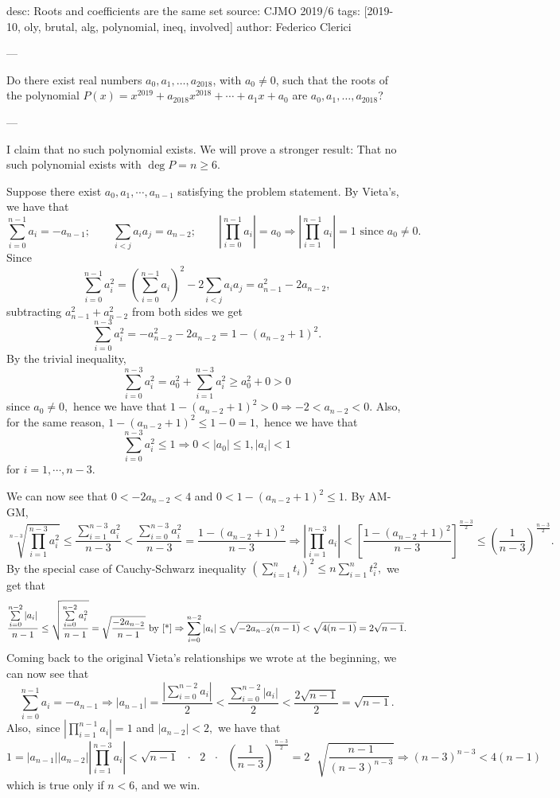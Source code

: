 desc: Roots and coefficients are the same set
source: CJMO 2019/6
tags: [2019-10, oly, brutal, alg, polynomial, ineq, involved]
author: Federico Clerici

---

Do there exist real numbers $a_0,a_1,\ldots,a_{2018}$, with $a_0\ne 0$, such that the roots of the polynomial $P(x)=x^{2019}+a_{2018}x^{2018}+\cdots+a_1x+a_0$ are $a_0,a_1,\ldots,a_{2018}$?

---

I claim that no such polynomial exists. We will prove a stronger result: That no such polynomial exists with $\deg P=n\ge 6$.

Suppose there exist $a_0,a_1,\cdots,a_{n-1}$ satisfying the problem statement. By Vieta's, we have that \[\sum_{i=0}^{n-1}a_i=-a_{n-1};\qquad\sum_{i<j}a_ia_j=a_{n-2};\qquad\left|\prod\limits_{i=0}^{n-1} a_i\right| =a_0\Rightarrow \left|\prod_{i=1}^{n-1} a_i\right|=1 \text{ since }a_0\neq 0.\]
Since
\begin{equation}\label{*}
    \sum\limits_{i=0}^{n-1}a_i^2=\left(\sum\limits_{i=0}^{n-1}a_i\right)^2-2\sum\limits_{i<j}a_ia_j=a_{n-1}^2-2a_{n-2},\tag{$\star$}
\end{equation}
subtracting $a_{n-1}^2+a_{n-2}^2$ from both sides we get \[\sum\limits_{i=0}^{n-3}a_i^2=-a_{n-2}^2-2a_{n-2}=1-(a_{n-2}+1)^2.\]
By the trivial inequality, \[\sum\limits_{i=0}^{n-3}a_i^2=a_0^2+\sum\limits_{i=1}^{n-3}a_i^2\geq a_0^2+0>0\] since $a_0\neq 0,$ hence we have that $1-(a_{n-2}+1)^2>0 \Rightarrow -2<a_{n-2}<0.$ Also, for the same reason, $1-(a_{n-2}+1)^2\leq 1-0=1,$ hence we have that \[\sum\limits_{i=0}^{n-3}a_i^2\leq 1\Rightarrow 0<|a_0|\leq 1, |a_i|<1\] for $i=1,\cdots, n-3.$

We can now see that $0<-2a_{n-2}<4$ and $0<1-(a_{n-2}+1)^2\leq 1.$ By AM-GM, {\small\[\sqrt[n-3]{\prod\limits_{i=1}^{n-3}a_i^2}\leq \frac{\sum\limits_{i=1}^{n-3}a_i^2}{n-3}<\frac{\sum\limits_{i=0}^{n-3}a_i^2}{n-3}=\frac{1-(a_{n-2}+1)^2}{n-3}\Rightarrow \left|\prod\limits_{i=1}^{n-3} a_i\right|<\left[\frac{1-(a_{n-2}+1)^2}{n-3}\right]^{\frac{n-3}{2}}\leq \left(\frac{1}{n-3}\right)^{\frac{n-3}{2}}.\]}
By the special case of Cauchy-Schwarz inequality $\left(\sum\limits_{i=1}^n t_i\right)^2\leq n \sum\limits_{i=1}^n t_i^2,$ we get that {\small\[\frac{\sum\limits_{i=0}^{n-2}|a_i|}{n-1}\leq \sqrt{\frac{\sum\limits_{i=0}^{n-2}a_i^2}{n-1}}=\sqrt{\frac{-2a_{n-2}}{n-1}} \text { by \eqref{*}} \Rightarrow \sum\limits_{i=0}^{n-2}|a_i|\leq \sqrt{-2a_{n-2}(n-1)}<\sqrt{4(n-1)}=2\sqrt{n-1}.\]}
Coming back to the original Vieta's relationships we wrote at the beginning, we can now see that \[\sum\limits_{i=0}^{n-1}a_i=-a_{n-1} \Rightarrow |a_{n-1}|=\frac{\left|\sum\limits_{i=0}^{n-2}a_i\right|}{2}<\frac{\sum\limits_{i=0}^{n-2}|a_i|}{2}<\frac{2\sqrt{n-1}}{2}=\sqrt{n-1}.\]Also$,$ since $\left|\prod\limits_{i=1}^{n-1} a_i\right|=1$ and $|a_{n-2}|<2,$ we have that {\small\[1=|a_{n-1}||a_{n-2}|\left|\prod\limits_{i=1}^{n-3} a_i\right|<
\sqrt{n-1}\text{ } \cdot \text{ }2\text{ }\cdot\text{ } \left(\frac{1}{n-3}\right)^{\frac{n-3}{2}}=2\text{ }\sqrt{\frac{n-1}{(n-3)^{n-3}}}\Rightarrow (n-3)^{n-3}<4(n-1)\]}
which is true only if $n<6$, and we win.
